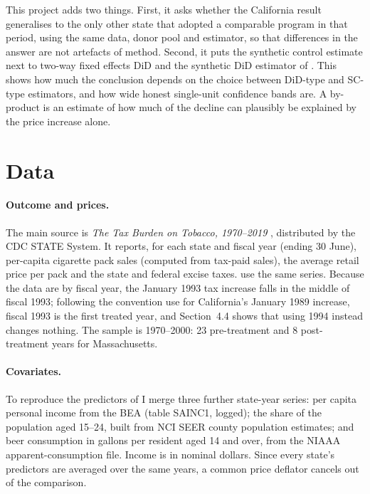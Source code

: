 \documentclass[11pt]{article}
\begin{document}
This project adds two things. First, it asks whether the California result
generalises to the only other state that adopted a comparable program in that
period, using the same data, donor pool and estimator, so that differences in
the answer are not artefacts of method. Second, it puts the synthetic control
estimate next to two-way fixed effects DiD and the synthetic DiD estimator of
\citet{arkhangelsky2021}. This shows how much the conclusion depends on the
choice between DiD-type and SC-type estimators, and how wide honest
single-unit confidence bands are. A by-product is an estimate of how much of the
decline can plausibly be explained by the price increase alone.

\section{Data}

\paragraph{Outcome and prices.}
The main source is \emph{The Tax Burden on Tobacco, 1970--2019}
\citep{orzechowski2019}, distributed by the CDC STATE System. It reports, for
each state and fiscal year (ending 30 June), per-capita cigarette pack sales
(computed from tax-paid sales), the average retail price per pack and the state
and federal excise taxes. \citet{adh2010} use the same series. Because the
data are by fiscal year, the January 1993 tax increase falls in the middle of
fiscal 1993; following the convention \citet{adh2010} use for California's
January 1989 increase, fiscal 1993 is the first treated year, and Section~4.4
shows that using 1994 instead changes nothing. The sample is 1970--2000: 23
pre-treatment and 8 post-treatment years for Massachusetts.

\paragraph{Covariates.}
To reproduce the predictors of \citet{adh2010} I merge three further
state-year series: per capita personal income from the BEA (table SAINC1,
logged); the share of the population aged 15--24, built from NCI SEER county
population estimates; and beer consumption in gallons per resident aged 14 and
over, from the NIAAA apparent-consumption file. Income is in nominal dollars.
Since every state's predictors are averaged over the same years, a common price
deflator cancels out of the comparison.
\end{document}
